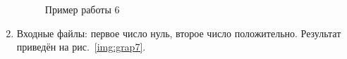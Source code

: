 \documentclass[12pt, a4paper]{article}
\begin{document}
\begin{enumerate}
\begin{figure}[h]
  		\caption{Пример работы 6}
  		\label{img:grap6}
	\end{figure}
	\newpage
	\item Входные файлы: первое число нуль, второе число положительно.
	Результат приведён на рис.~\ref{img:grap7}.
	\begin{figure}[h]

\end{figure}
\end{enumerate}
\end{document}
